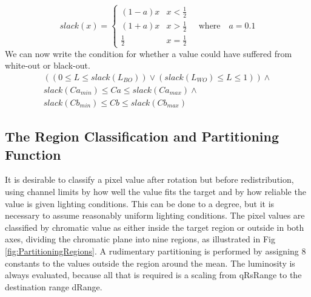  \begin{equation}
 slack(x) = \begin{cases}
 (1-a) x     & x < \frac{1}{2} \\
 (1+a) x     & x > \frac{1}{2} \\
 \frac{1}{2} & x = \frac{1}{2} 
 \end{cases} \quad \text{where} \quad a = 0.1
   \end{equation}
 We can now write the condition for whether a value could have suffered from white-out or black-out. 
  \begin{multline}\label{eq:InWoBoRegion}
 (( 0 \le L \le  slack(L_{BO}) ) \vee ( slack(L_{WO}) \le L \le 1) ) \wedge  \\
 slack(Ca_{min}) \le Ca \le  slack(Ca_{max}) \wedge  \\
 slack(Cb_{min}) \le Cb \le  slack(Cb_{max})
  \end{multline}
  
  \subsection{The Region Classification and Partitioning Function}\label{sec:TheRegionClassificationAndPartitioningFunction}
  It is desirable to classify a pixel value after rotation but before redistribution, using channel limits by how well the value fits the target and by how reliable the value is given lighting conditions. This can be done to a degree, but it is necessary to assume reasonably uniform lighting conditions. The pixel values are classified by chromatic value as either inside the target region or outside in both axes, dividing the chromatic plane into nine regions, as illustrated in Fig \ref{fig:PartitioningRegions}. A rudimentary partitioning is performed by assigning 8 constants to the values outside the region around the mean. The luminosity is always evaluated, because all that is required is a scaling from qRsRange to the destination range dRange. 
  
